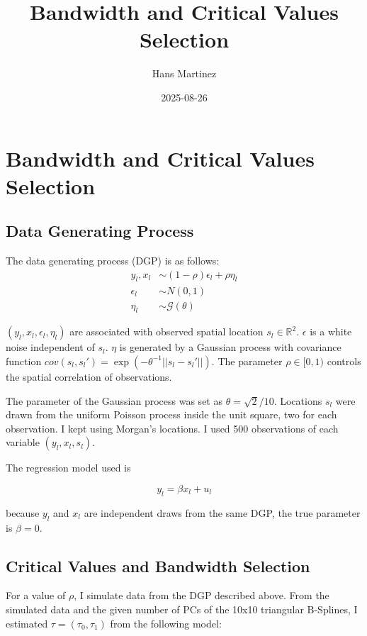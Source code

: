 \documentclass[
]{article}
\title{Bandwidth and Critical Values Selection}
\author{Hans Martinez}
\date{2025-08-26}
\begin{document}
\maketitle

\section{Bandwidth and Critical Values
Selection}\label{bandwidth-and-critical-values-selection}

\subsection{Data Generating Process}\label{data-generating-process}

The data generating process (DGP) is as follows: \[
\begin{aligned}
    y_l, x_l &\sim (1-\rho)\epsilon_l +\rho \eta_l \\
    \epsilon_l &\sim N(0,1) \\
    \eta_l &\sim \mathcal{G}(\theta)
\end{aligned}
\]

\((y_l,x_l,\epsilon_l,\eta_l)\) are associated with observed spatial
location \(s_l \in \mathbb{R}^2\). \(\epsilon\) is a white noise
independent of \(s_l\). \(\eta\) is generated by a Gaussian process with
covariance function
\(cov(s_l,s_{l}')=\exp(-\theta^{-1}||s_l-s_{l}'||)\). The parameter
\(\rho\in[0,1)\) controls the spatial correlation of observations.

The parameter of the Gaussian process was set as \(\theta=\sqrt{2}/10\).
Locations \(s_l\) were drawn from the uniform Poisson process inside the
unit square, two for each observation. I kept using Morgan's locations.
I used 500 observations of each variable \((y_l,x_l,s_l)\).

The regression model used is

\[
    y_l=\beta x_l + u_l 
\]

because \(y_l\) and \(x_l\) are independent draws from the same DGP, the
true parameter is \(\beta=0\).

\subsection{Critical Values and Bandwidth
Selection}\label{critical-values-and-bandwidth-selection}

For a value of \(\rho\), I simulate data from the DGP described above.
From the simulated data and the given number of PCs of the 10x10
triangular B-Splines, I estimated \(\tau = (\tau_0, \tau_1)\) from the
following model:
\end{document}

